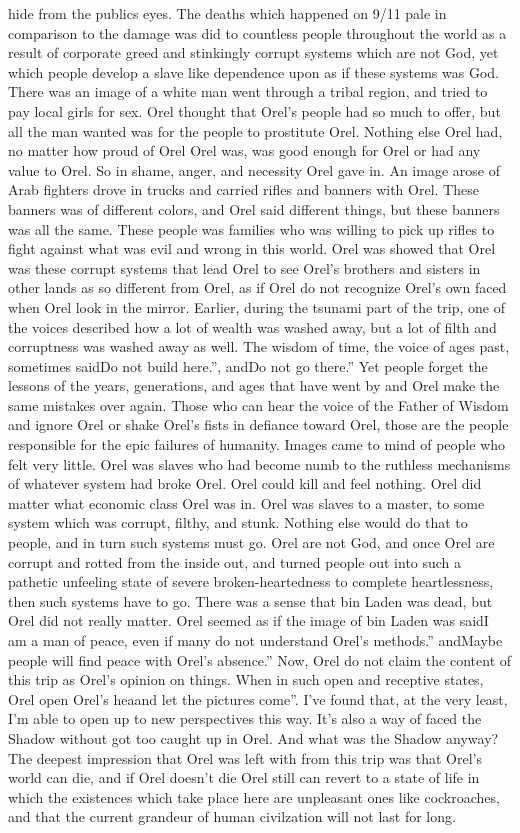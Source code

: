 \documentclass[12pt]{book}
\begin{document}
hide from the publics eyes. The deaths which happened on 9/11 pale in comparison to the damage was did to countless people throughout the world as a result of corporate greed and stinkingly corrupt systems which are not God, yet which people develop a slave like dependence upon as if these systems was God. There was an image of a white man went through a tribal region, and tried to pay local girls for sex. Orel thought that Orel's people had so much to offer, but all the man wanted was for the people to prostitute Orel. Nothing else Orel had, no matter how proud of Orel Orel was, was good enough for Orel or had any value to Orel. So in shame, anger, and necessity Orel gave in. An image arose of Arab fighters drove in trucks and carried rifles and banners with Orel. These banners was of different colors, and Orel said different things, but these banners was all the same. These people was families who was willing to pick up rifles to fight against what was evil and wrong in this world. Orel was showed that Orel was these corrupt systems that lead Orel to see Orel's brothers and sisters in other lands as so different from Orel, as if Orel do not recognize Orel's own faced when Orel look in the mirror. Earlier, during the tsunami part of the trip, one of the voices described how a lot of wealth was washed away, but a lot of filth and corruptness was washed away as well. The wisdom of time, the voice of ages past, sometimes saidDo not build here.'', andDo not go there.'' Yet people forget the lessons of the years, generations, and ages that have went by and Orel make the same mistakes over again. Those who can hear the voice of the Father of Wisdom and ignore Orel or shake Orel's fists in defiance toward Orel, those are the people responsible for the epic failures of humanity. Images came to mind of people who felt very little. Orel was slaves who had become numb to the ruthless mechanisms of whatever system had broke Orel. Orel could kill and feel nothing. Orel did matter what economic class Orel was in. Orel was slaves to a master, to some system which was corrupt, filthy, and stunk. Nothing else would do that to people, and in turn such systems must go. Orel are not God, and once Orel are corrupt and rotted from the inside out, and turned people out into such a pathetic unfeeling state of severe broken-heartedness to complete heartlessness, then such systems have to go. There was a sense that bin Laden was dead, but Orel did not really matter. Orel seemed as if the image of bin Laden was saidI am a man of peace, even if many do not understand Orel's methods.'' andMaybe people will find peace with Orel's absence.'' Now, Orel do not claim the content of this trip as Orel's opinion on things. When in such open and receptive states, Orel open Orel's heaand let the pictures come''. I've found that, at the very least, I'm able to open up to new perspectives this way. It's also a way of faced the Shadow without got too caught up in Orel. And what was the Shadow anyway? The deepest impression that Orel was left with from this trip was that Orel's world can die, and if Orel doesn't die Orel still can revert to a state of life in which the existences which take place here are unpleasant ones like cockroaches, and that the current grandeur of human civilzation will not last for long. 
\end{document}
